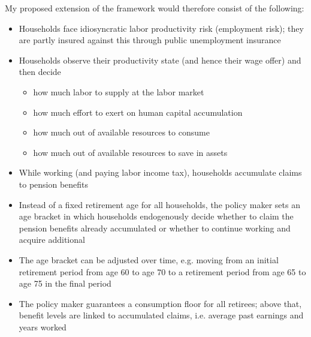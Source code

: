 My proposed extension of the framework would therefore consist of the following:
\begin{itemize}
    \item Households face idiosyncratic labor productivity risk (employment risk); they are partly insured against this through public unemployment insurance
    \item Households observe their productivity state (and hence their wage offer) and then decide
        \begin{itemize}
            \item how much labor to supply at the labor market
            \item how much effort to exert on human capital accumulation
            \item how much out of available resources to consume
            \item how much out of available resources to save in assets
        \end{itemize}
    \item While working (and paying labor income tax), households accumulate claims to pension benefits
    \item Instead of a fixed retirement age for all households, the policy maker sets an age bracket in which households endogenously decide whether to claim the pension benefits already accumulated or whether to continue working and acquire additional
    \item The age bracket can be adjusted over time, e.g. moving from an initial retirement period from age 60 to age 70 to a retirement period from age 65 to age 75 in the final period
    \item The policy maker guarantees a consumption floor for all retirees; above that, benefit levels are linked to accumulated claims, i.e. average past earnings and years worked
\end{itemize}

